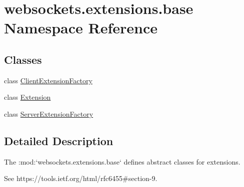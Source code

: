 \hypertarget{namespacewebsockets_1_1extensions_1_1base}{}\section{websockets.\+extensions.\+base Namespace Reference}
\label{namespacewebsockets_1_1extensions_1_1base}
\subsection*{Classes}
\begin{DoxyCompactItemize}
\item 
class \hyperlink{classwebsockets_1_1extensions_1_1base_1_1_client_extension_factory}{Client\+Extension\+Factory}
\item 
class \hyperlink{classwebsockets_1_1extensions_1_1base_1_1_extension}{Extension}
\item 
class \hyperlink{classwebsockets_1_1extensions_1_1base_1_1_server_extension_factory}{Server\+Extension\+Factory}
\end{DoxyCompactItemize}


\subsection{Detailed Description}
\begin{DoxyVerb}The :mod:`websockets.extensions.base` defines abstract classes for extensions.

See https://tools.ietf.org/html/rfc6455#section-9.\end{DoxyVerb}
 